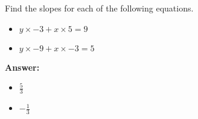  Find the slopes for each of the following equations. \begin{itemize}\item \( y \times -3 + x \times 5 = 9 \)\item \( y \times -9 + x \times -3 = 5 \)\end{itemize}

        \textbf{Answer:} \begin{itemize}\item \( \frac{5}{3} \)\item \( -\frac{1}{3} \)\end{itemize}
